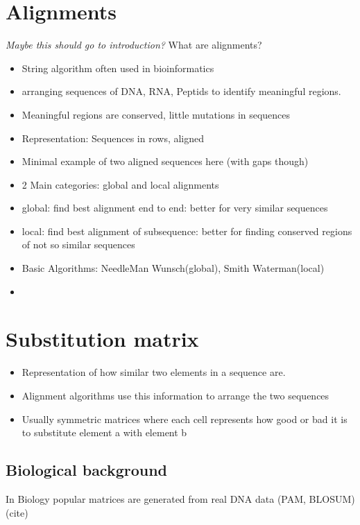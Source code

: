 \section{Alignments}
\textit{Maybe this should go to introduction?}
What are alignments? 
\begin{itemize}
	\item String algorithm often used in bioinformatics 
	\item arranging sequences of DNA, RNA, Peptids to identify meaningful regions.
	\item Meaningful regions are conserved, little mutations in sequences
	\item Representation: Sequences in rows, aligned 
	\item Minimal example of two aligned sequences here (with gaps though)
	\item 2 Main categories: global and local alignments 
	\item global: find best alignment end to end: better for very similar sequences
	\item local: find best alignment of subsequence: better for finding conserved regions of not so similar sequences
	\item Basic Algorithms: NeedleMan Wunsch(global), Smith Waterman(local) 
	\item 
\end{itemize} 
\section{Substitution matrix}
\begin{itemize}
	\item Representation of how similar two elements in a sequence are. 
	\item Alignment algorithms use this information to arrange the two sequences 
	\item Usually symmetric matrices where each cell represents how good or bad it is to substitute element a with element b  
\end{itemize}
\subsection{Biological background}
In Biology popular matrices are generated from real DNA data (PAM, BLOSUM) (cite)
